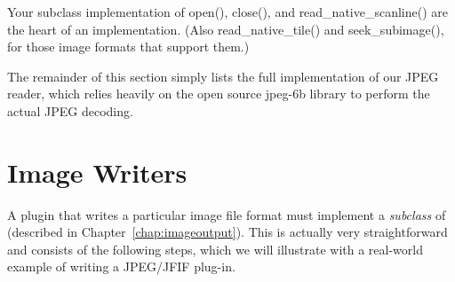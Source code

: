 Your subclass implementation of {\cf open()}, {\cf close()}, and {\cf
  read_native_scanline()} are the heart of an \ImageInput
implementation.  (Also {\cf read_native_tile()} and {\cf
  seek_subimage()}, for those image formats that support them.)

The remainder of this section simply lists the full implementation of
our JPEG reader, which relies heavily on the open source {\fn jpeg-6b}
library to perform the actual JPEG decoding.





\section{Image Writers}
\label{sec:pluginwriters}

A plugin that writes a particular image file format must implement a
\emph{subclass} of \ImageOutput (described in
Chapter~\ref{chap:imageoutput}).  This is actually very straightforward
and consists of the following steps, which we will illustrate with a
real-world example of writing a JPEG/JFIF plug-in.

